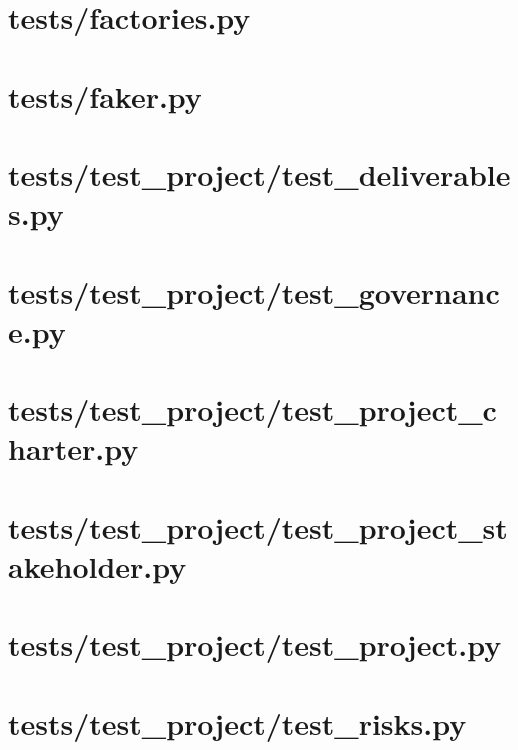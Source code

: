 \section{tests/factories.py}


\pagebreak

\section{tests/faker.py}


\pagebreak

\section{tests/test\_project/test\_deliverables.py}


\pagebreak

\section{tests/test\_project/test\_governance.py}


\pagebreak

\section{tests/test\_project/test\_project\_charter.py}


\pagebreak

\section{tests/test\_project/test\_project\_stakeholder.py}


\pagebreak

\section{tests/test\_project/test\_project.py}


\pagebreak

\section{tests/test\_project/test\_risks.py}


